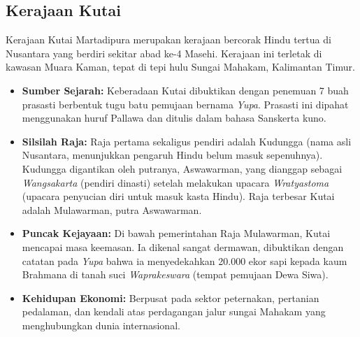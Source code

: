 \documentclass[12pt, a4paper]{article}
\begin{document}
\subsection{Kerajaan Kutai}
Kerajaan Kutai Martadipura merupakan kerajaan bercorak Hindu tertua di Nusantara yang berdiri sekitar abad ke-4 Masehi. Kerajaan ini terletak di kawasan Muara Kaman, tepat di tepi hulu Sungai Mahakam, Kalimantan Timur.
\begin{itemize}
	\item \textbf{Sumber Sejarah:} Keberadaan Kutai dibuktikan dengan penemuan 7 buah prasasti berbentuk tugu batu pemujaan bernama \textit{Yupa}. Prasasti ini dipahat menggunakan huruf Pallawa dan ditulis dalam bahasa Sanskerta kuno.
	\item \textbf{Silsilah Raja:} Raja pertama sekaligus pendiri adalah Kudungga (nama asli Nusantara, menunjukkan pengaruh Hindu belum masuk sepenuhnya). Kudungga digantikan oleh putranya, Aswawarman, yang dianggap sebagai \textit{Wangsakarta} (pendiri dinasti) setelah melakukan upacara \textit{Wratyastoma} (upacara penyucian diri untuk masuk kasta Hindu). Raja terbesar Kutai adalah Mulawarman, putra Aswawarman.
	\item \textbf{Puncak Kejayaan:} Di bawah pemerintahan Raja Mulawarman, Kutai mencapai masa keemasan. Ia dikenal sangat dermawan, dibuktikan dengan catatan pada \textit{Yupa} bahwa ia menyedekahkan 20.000 ekor sapi kepada kaum Brahmana di tanah suci \textit{Waprakeswara} (tempat pemujaan Dewa Siwa).
	\item \textbf{Kehidupan Ekonomi:} Berpusat pada sektor peternakan, pertanian pedalaman, dan kendali atas perdagangan jalur sungai Mahakam yang menghubungkan dunia internasional.
\end{itemize}
\end{document}
